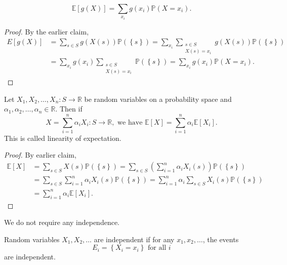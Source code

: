 \begin{claim}
    \[
        \mathbb{E} [g(X)] = \sum_{x_i} g(x_i) \mathbb{P} (X = x_i). 
    \]
\end{claim}

\begin{proof}
    By the earlier claim, 
    \begin{align*}
        E [g(X)] &= \sum_{s \in S} g(X(s)) \mathbb{P} \left( \left\{ s \right\}  \right) = \sum_{x_i} \sum_{\substack{s \in S \\ X(s) = x_i}} g(X(s)) \mathbb{P} \left( \left\{ s \right\}  \right) \\
        &= \sum_{x_i} g(x_i) \sum_{\substack{s \in S \\ X(s) = x_i}} \mathbb{P} \left( \left\{ s \right\}  \right) = \sum_{x_i} g(x_i) \mathbb{P} (X = x_i).       
    \end{align*}
\end{proof}

\begin{proposition}
    Let \(X_1, X_2, \dots , X_n: S \to \mathbb{R} \) be random variables on a probability space and \(\alpha _1, \alpha _2, \dots , \alpha _n \in \mathbb{R} \). Then if 
    \[
        X = \sum_{i=1}^n \alpha _i X_i : S \to \mathbb{R} , \text{ we have } \mathbb{E} [X] = \sum_{i=1}^n \alpha _i \mathbb{E} [X_i].   
    \] 
    This is called linearity of expectation. 
\end{proposition}

\begin{proof}
    By earlier claim,
    \begin{align*}
        \mathbb{E} [X] &= \sum_{s \in S} X(s) \mathbb{P} \left( \left\{ s \right\}  \right) = \sum_{s \in S} \left( \sum_{i=1}^n \alpha _i X_i(s)  \right) \mathbb{P} \left( \left\{ s \right\}  \right) \\
        &= \sum_{s \in S} \sum_{i=1}^n \alpha _i X_i(s) \mathbb{P} \left( \left\{ s \right\}  \right) = \sum_{i=1}^n \alpha _i \sum_{s \in S} X_i(s) \mathbb{P} \left( \left\{ s \right\}  \right) \\
        &= \sum_{i=1}^n \alpha _i \mathbb{E} [X_i].            
    \end{align*}
\end{proof}

\begin{remark}
    We do not require any independence.
\end{remark}

\begin{definition}
    Random variables \(X_1, X_2, \dots \) are independent if for any \(x_1, x_2, \dots \), the events 
    \[
        E_i = \left\{ X_i = x_i \right\} \text{ for all } i 
    \] 
    are independent.
\end{definition}

